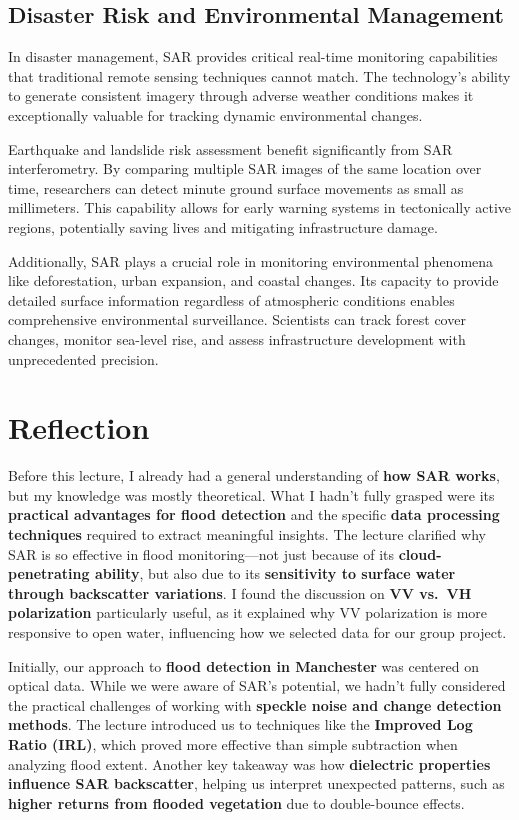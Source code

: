 \documentclass[
  letterpaper,
]{scrbook}
\begin{document}
\subsection{Disaster Risk and Environmental
Management}\label{disaster-risk-and-environmental-management}

In disaster management, SAR provides critical real-time monitoring
capabilities that traditional remote sensing techniques cannot match.
The technology's ability to generate consistent imagery through adverse
weather conditions makes it exceptionally valuable for tracking dynamic
environmental changes.

Earthquake and landslide risk assessment benefit significantly from SAR
interferometry. By comparing multiple SAR images of the same location
over time, researchers can detect minute ground surface movements as
small as millimeters. This capability allows for early warning systems
in tectonically active regions, potentially saving lives and mitigating
infrastructure damage.

Additionally, SAR plays a crucial role in monitoring environmental
phenomena like deforestation, urban expansion, and coastal changes. Its
capacity to provide detailed surface information regardless of
atmospheric conditions enables comprehensive environmental surveillance.
Scientists can track forest cover changes, monitor sea-level rise, and
assess infrastructure development with unprecedented precision.

\section{Reflection}\label{reflection-6}

Before this lecture, I already had a general understanding of
\textbf{how SAR works}, but my knowledge was mostly theoretical. What I
hadn't fully grasped were its \textbf{practical advantages for flood
detection} and the specific \textbf{data processing techniques} required
to extract meaningful insights. The lecture clarified why SAR is so
effective in flood monitoring---not just because of its
\textbf{cloud-penetrating ability}, but also due to its
\textbf{sensitivity to surface water through backscatter variations}. I
found the discussion on \textbf{VV vs.~VH polarization} particularly
useful, as it explained why VV polarization is more responsive to open
water, influencing how we selected data for our group project.

Initially, our approach to \textbf{flood detection in Manchester} was
centered on optical data. While we were aware of SAR's potential, we
hadn't fully considered the practical challenges of working with
\textbf{speckle noise and change detection methods}. The lecture
introduced us to techniques like the \textbf{Improved Log Ratio (IRL)},
which proved more effective than simple subtraction when analyzing flood
extent. Another key takeaway was how \textbf{dielectric properties
influence SAR backscatter}, helping us interpret unexpected patterns,
such as \textbf{higher returns from flooded vegetation} due to
double-bounce effects.
\end{document}
